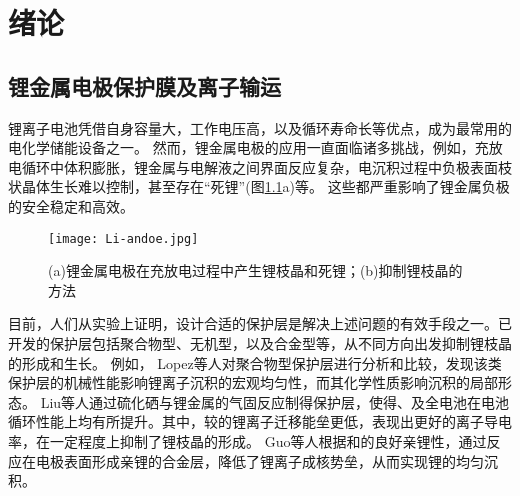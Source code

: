 \chapter{绪论}
\section{锂金属电极保护膜及离子输运}

锂离子电池凭借自身容量大，工作电压高，以及循环寿命长等优点，成为最常用的电化学储能设备之一。
然而，锂金属电极的应用一直面临诸多挑战，例如，充放电循环中体积膨胀，锂金属与电解液之间界面反应复杂，电沉积过程中负极表面枝状晶体生长难以控制，甚至存在“死锂”(图\ref{fig:Li-anode}a)等。
这些都严重影响了锂金属负极的安全稳定和高效。

\begin{figure}[htbp]
    \centering
    \texttt{[image: Li-andoe.jpg]}
    \caption{(a)锂金属电极在充放电过程中产生锂枝晶和死锂；(b)抑制锂枝晶的方法}
    \label{fig:Li-anode}
\end{figure}

目前，人们从实验上证明，设计合适的保护层是解决上述问题的有效手段之一。已开发的保护层包括聚合物型、无机型，以及合金型等，从不同方向出发抑制锂枝晶的形成和生长。
例如， Lopez等人对聚合物型保护层进行分析和比较，发现该类保护层的机械性能影响锂离子沉积的宏观均匀性，而其化学性质影响沉积的局部形态。
Liu等人通过硫化硒与锂金属的气固反应制得保护层，使得、及全电池在电池循环性能上均有所提升。其中，较的锂离子迁移能垒更低，表现出更好的离子导电率，在一定程度上抑制了锂枝晶的形成。
Guo等人根据和的良好亲锂性，通过反应在电极表面形成亲锂的合金层，降低了锂离子成核势垒，从而实现锂的均匀沉积。


